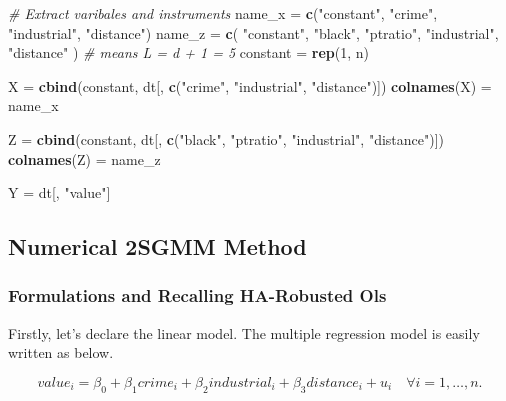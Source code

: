 \documentclass[
  12pt,
]{article}
\newenvironment{Shaded}{\begin{snugshade}}{\end{snugshade}}
\newcommand{\CommentTok}[1]{\textcolor[rgb]{0.56,0.35,0.01}{\textit{#1}}}
\newcommand{\DecValTok}[1]{\textcolor[rgb]{0.00,0.00,0.81}{#1}}
\newcommand{\KeywordTok}[1]{\textcolor[rgb]{0.13,0.29,0.53}{\textbf{#1}}}
\newcommand{\NormalTok}[1]{#1}
\newcommand{\StringTok}[1]{\textcolor[rgb]{0.31,0.60,0.02}{#1}}
\begin{document}
\begin{Shaded}
\begin{Highlighting}[]
\CommentTok{\# Extract varibales and instruments}
\NormalTok{name\_x =}\StringTok{ }\KeywordTok{c}\NormalTok{(}\StringTok{"constant"}\NormalTok{, }\StringTok{"crime"}\NormalTok{, }\StringTok{"industrial"}\NormalTok{, }\StringTok{"distance"}\NormalTok{)}
\NormalTok{name\_z =}\StringTok{ }\KeywordTok{c}\NormalTok{(}
    \StringTok{"constant"}\NormalTok{, }\StringTok{"black"}\NormalTok{,  }\StringTok{"ptratio"}\NormalTok{, }\StringTok{"industrial"}\NormalTok{, }\StringTok{"distance"}
\NormalTok{) }\CommentTok{\# means L = d + 1 = 5}
\NormalTok{constant =}\StringTok{ }\KeywordTok{rep}\NormalTok{(}\DecValTok{1}\NormalTok{, n)}

\NormalTok{X =}\StringTok{ }\KeywordTok{cbind}\NormalTok{(constant, dt[, }\KeywordTok{c}\NormalTok{(}\StringTok{"crime"}\NormalTok{, }\StringTok{"industrial"}\NormalTok{, }\StringTok{"distance"}\NormalTok{)])}
\KeywordTok{colnames}\NormalTok{(X) =}\StringTok{ }\NormalTok{name\_x}

\NormalTok{Z =}\StringTok{ }\KeywordTok{cbind}\NormalTok{(constant, dt[, }\KeywordTok{c}\NormalTok{(}\StringTok{"black"}\NormalTok{, }\StringTok{"ptratio"}\NormalTok{, }\StringTok{"industrial"}\NormalTok{, }\StringTok{"distance"}\NormalTok{)])}
\KeywordTok{colnames}\NormalTok{(Z) =}\StringTok{ }\NormalTok{name\_z}

\NormalTok{Y =}\StringTok{ }\NormalTok{dt[, }\StringTok{"value"}\NormalTok{]   }
\end{Highlighting}
\end{Shaded}

\hypertarget{numerical-2sgmm-method}{%
\subsection{Numerical 2SGMM Method}\label{numerical-2sgmm-method}}

\hypertarget{formulations-and-recalling-ha-robusted-ols}{%
\subsubsection{Formulations and Recalling HA-Robusted Ols}\label{formulations-and-recalling-ha-robusted-ols}}

Firstly, let's declare the linear model. The multiple regression model is easily written as below.

\[
    value_i = \beta_0 + \beta_1 crime_i + \beta_2 industrial_i + \beta_3 distance_i + u_i \quad \forall i = 1, \dots, n.
\]
\end{document}
